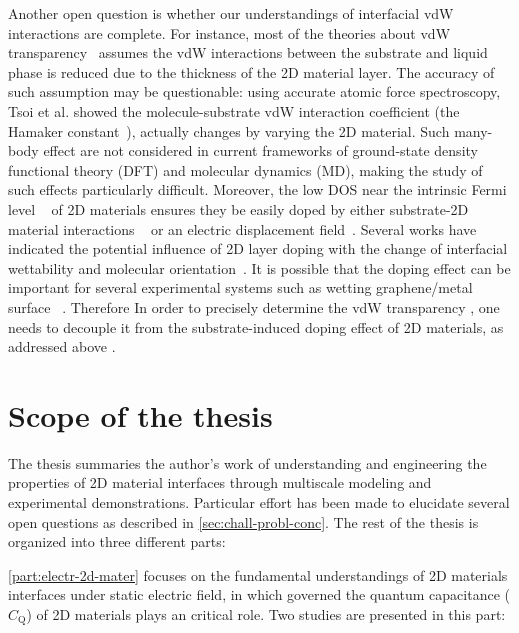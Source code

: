 Another open question is whether our understandings of interfacial vdW
interactions are complete. For instance, most of the theories about
vdW transparency~\cite{Shih_2012_prl,Kim_2015_wetting_controversy}
assumes the
vdW interactions between the substrate and liquid phase is reduced due
to the thickness of the 2D material layer.
%
The accuracy of such assumption may be questionable: using accurate atomic
force spectroscopy, Tsoi et al. showed the molecule-substrate vdW
interaction coefficient (the Hamaker
constant~\cite{parsegian_van_2010_book}), actually changes by varying the
2D material\cite{Tsoi_2014_vdW_screening_2D}.
%
Such many-body effect are not considered in current frameworks of
ground-state density functional theory (DFT) and molecular dynamics
(MD), making the study of such effects particularly difficult.
%
Moreover, the low DOS near the intrinsic Fermi level
~\cite{Das_Sarma_2011_electron_gr,Bhimanapati_2015_2D_rev} of 2D
materials ensures they be easily doped by either substrate-2D material
interactions
~\cite{Varchon_2007_elec_struc_gr_SiC,Giovannetti_2008_doping,Chen_2013_doping}
or an electric displacement
field~\cite{Das_2008_doping,Perera_2013_doping}.
%
Several works have indicated the potential influence of 2D layer
doping with the change of interfacial wettability and molecular
orientation~\cite{Huttmann_2015_vdw_gr_doping,Nguyen_2019_PEN}.
%
It is possible that the doping effect can be important for several
experimental systems such as wetting
graphene\allowbreak{}/\allowbreak{}metal
surface~\cite{Giovannetti_2008_doping,Pi_2009_metal_doping_gr} .
%
Therefore In order to precisely determine the vdW transparency , one
needs to decouple it from the substrate-induced doping effect of 2D
materials, as addressed above
\cite{Huttmann_2015_vdw_gr_doping,Muruganathan_2015_tunable_vdw_gr,Hong_2016_mechanism,Ashraf_2016_doping}.


\section{Scope of the thesis}
\label{sec:scope-thesis}

The thesis summaries the author's work of understanding and
engineering the properties of 2D material interfaces through
multiscale modeling and experimental demonstrations. Particular effort
has been made to elucidate several open questions as described in
\autoref{sec:chall-probl-conc}. The rest of the thesis is organized
into three different parts:

\autoref{part:electr-2d-mater} focuses on the fundamental
understandings of 2D materials interfaces under static electric field,
in which governed the quantum capacitance ($C_{\mathrm{Q}}$) of 2D
materials plays an critical role.
%
Two studies are
presented in this part:
%

